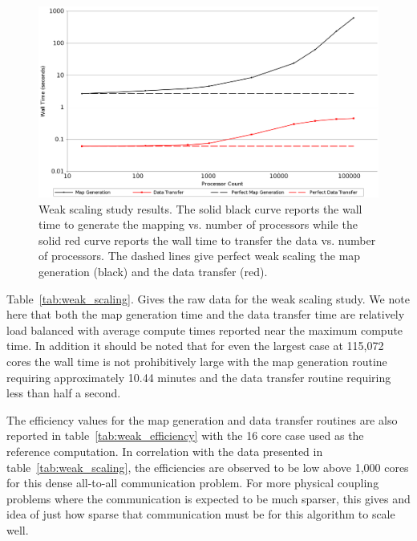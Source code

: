 \documentclass{mc2013}
\begin{document}
\begin{figure}[ht!]
  \centering
  \includegraphics[width=5.5in]{WeakScaling.png}
  \caption{Weak scaling study results. The solid black curve reports
    the wall time to generate the mapping vs. number of processors
    while the solid red curve reports the wall time to transfer the
    data vs. number of processors. The dashed lines give
    perfect weak scaling the map generation (black) and the data
    transfer (red).}
  \label{fig:weak_scaling}
\end{figure}

Table~\ref{tab:weak_scaling}. Gives the raw data for the weak scaling
study. We note here that both the map generation time and the data
transfer time are relatively load balanced with average compute times
reported near the maximum compute time. In addition it should be noted
that for even the largest case at 115,072 cores the wall time is not
prohibitively large with the map generation routine requiring
approximately 10.44 minutes and the data transfer routine requiring
less than half a second.

The efficiency values for the map generation and data transfer
routines are also reported in table~\ref{tab:weak_efficiency} with the
16 core case used as the reference computation. In correlation with
the data presented in table~\ref{tab:weak_scaling}, the efficiencies
are observed to be low above 1,000 cores for this dense all-to-all
communication problem. For more physical coupling problems where the
communication is expected to be much sparser, this gives and idea of
just how sparse that communication must be for this algorithm to scale
well.
\end{document}
